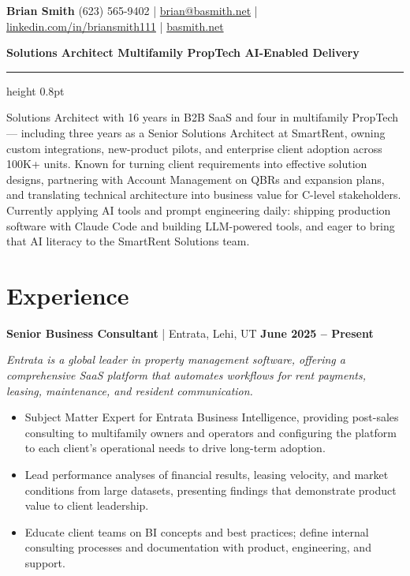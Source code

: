 \documentclass[10pt,letterpaper]{article}
\newcommand{\role}[4]{%
  \vspace{4pt}%
  {\textbf{#2} \textcolor{rulegray}{|} #1 \hfill \textbf{#3}}\par
  {\small\itshape #4\par}}
\newenvironment{roleblock}{\par\begin{minipage}{\textwidth}}{\end{minipage}\par\vspace{7pt}}
\begin{document}
{\huge\bfseries Brian Smith}\hfill
{(623) 565-9402 \;|\; \href{mailto:brian@basmith.net}{brian@basmith.net} \;|\;
\href{https://www.linkedin.com/in/briansmith111}{linkedin.com/in/briansmith111} \;|\;
\href{https://basmith.net}{basmith.net}}\par
\vspace{2pt}
{\color{accent}\bfseries Solutions Architect \;\textbullet\; Multifamily PropTech \;\textbullet\; AI-Enabled Delivery}\par
\vspace{4pt}
{\color{rulegray}\hrule height 0.8pt}
\vspace{6pt}

Solutions Architect with 16 years in B2B SaaS and four in multifamily PropTech — including three years as a Senior Solutions Architect at SmartRent, owning custom integrations, new-product pilots, and enterprise client adoption across 100K+ units. Known for turning client requirements into effective solution designs, partnering with Account Management on QBRs and expansion plans, and translating technical architecture into business value for C-level stakeholders. Currently applying AI tools and prompt engineering daily: shipping production software with Claude Code and building LLM-powered tools, and eager to bring that AI literacy to the SmartRent Solutions team.

\section{Experience}

\begin{roleblock}
\role{Entrata, Lehi, UT}{Senior Business Consultant}{June 2025 -- Present}
{Entrata is a global leader in property management software, offering a comprehensive SaaS platform that automates workflows for rent payments, leasing, maintenance, and resident communication.}
\begin{itemize}
  \item Subject Matter Expert for Entrata Business Intelligence, providing post-sales consulting to multifamily owners and operators and configuring the platform to each client's operational needs to drive long-term adoption.
  \item Lead performance analyses of financial results, leasing velocity, and market conditions from large datasets, presenting findings that demonstrate product value to client leadership.
  \item Educate client teams on BI concepts and best practices; define internal consulting processes and documentation with product, engineering, and support.
\end{itemize}
\end{roleblock}
\end{document}
